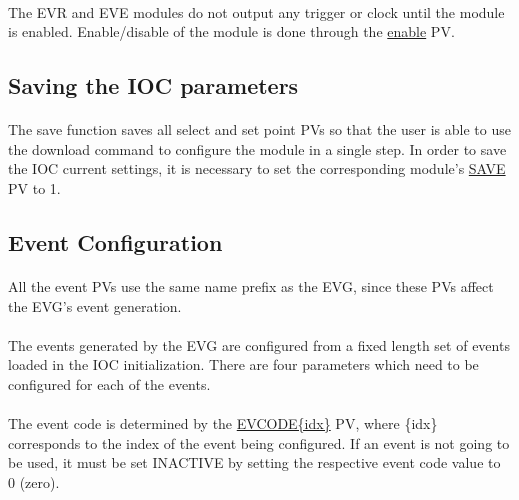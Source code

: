\documentclass[openany]{article}
\begin{document}
			\paragraph{} The EVR and EVE modules do not output any trigger or clock until the module is enabled. Enable/disable of the module is done through the \hyperref[pvgroup:evg-control-status]{enable} PV.

	\subsection{Saving the IOC parameters}
		\paragraph{} The save function saves all select and set point PVs so that the user is able to use the download command to configure the module in a single step. In order to save the IOC current settings, it is necessary to set the corresponding module's \hyperref[pvgroup:evg-module-support]{SAVE} PV to 1.

	\subsection{Event Configuration}
		\paragraph{} All the event PVs use the same name prefix as the EVG, since these PVs affect the EVG's event generation.
		\paragraph{} The events generated by the EVG are configured from a fixed length set of events loaded in the IOC initialization. There are four parameters which need to be configured for each of the events.
		\paragraph{} The event code is determined by the \hyperref[pvgroup:evg-event]{EVCODE\{idx\}} PV, where \{idx\} corresponds to the index of the event being configured. If an event is not going to be used, it must be set INACTIVE by setting the respective event code value to 0 (zero).
\end{document}
